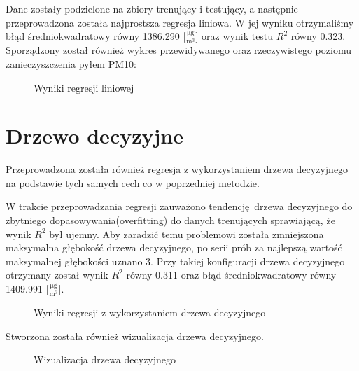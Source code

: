 \documentclass{article}
\begin{document}
	Dane zostały podzielone na zbiory trenujący i testujący, a następnie przeprowadzona została najprostsza regresja liniowa. W jej wyniku otrzymaliśmy błąd średniokwadratowy równy 1386.290 [$\frac{\si{\micro\gram}}{\si\meter^3}$] oraz wynik testu $R^2$ równy 0.323. Sporządzony został również wykres przewidywanego oraz rzeczywistego poziomu zanieczyszczenia pyłem PM10:
	\begin{figure}[!ht]
		\centering
		\caption{Wyniki regresji liniowej}
	\end{figure}
	\FloatBarrier
	
	\section{Drzewo decyzyjne}
	Przeprowadzona została również regresja z wykorzystaniem drzewa decyzyjnego na podstawie tych samych cech co w poprzedniej metodzie. 
	
	W trakcie przeprowadzania regresji zauważono tendencję drzewa decyzyjnego do zbytniego dopasowywania(overfitting) do danych trenujących sprawiającą, że wynik $R^2$ był ujemny. 
	Aby zaradzić temu problemowi została zmniejszona maksymalna głębokość drzewa decyzyjnego, po serii prób za najlepszą wartość maksymalnej głębokości uznano 3. Przy takiej konfiguracji drzewa decyzyjnego otrzymany został wynik $R^2$ równy 0.311 oraz błąd średniokwadratowy równy 1409.991 [$\frac{\si{\micro\gram}}{\si\meter^3}$].
	\begin{figure}[!ht]
		\centering
		\caption{Wyniki regresji z wykorzystaniem drzewa decyzyjnego}
	\end{figure}
	\FloatBarrier
	Stworzona została również wizualizacja drzewa decyzyjnego.
	\begin{figure}[!ht]
		\centering
		\caption{Wizualizacja drzewa decyzyjnego}
	\end{figure}
	\FloatBarrier
	
\end{document}
